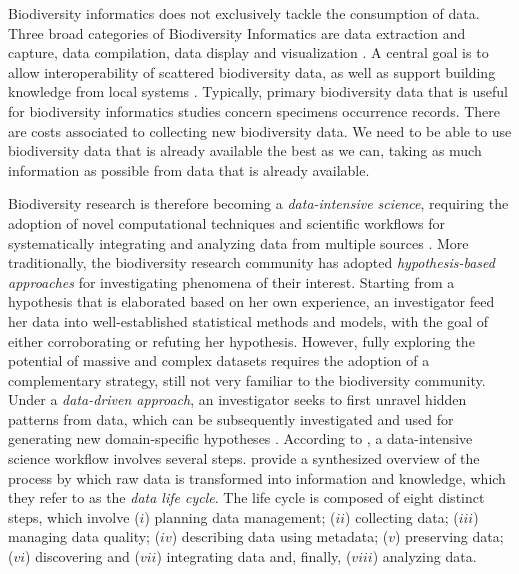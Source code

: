 Biodiversity informatics does not exclusively tackle the consumption of data.
Three broad categories of Biodiversity Informatics are data extraction and capture, data compilation, data display and visualization \cite{Peterson2010}.
A central goal is to allow interoperability of scattered biodiversity data, as well as support building knowledge from local systems \cite{Bisby2000}.
Typically, primary biodiversity data that is useful for biodiversity informatics studies concern specimens occurrence records.
There are costs associated to collecting new biodiversity data.
We need to be able to use biodiversity data that is already available the best as we can, taking as much information as possible from data that is already available.


Biodiversity research is therefore becoming a \textit{data-intensive science}, requiring the adoption of novel computational techniques and scientific workflows for systematically integrating and analyzing data from multiple sources \cite{Kelling2009}.
%
More traditionally, the biodiversity research community has adopted \textit{hypothesis-based approaches} for investigating phenomena of their interest.
Starting from a hypothesis that is elaborated based on her own experience, an investigator feed her data into well-established statistical methods and models, with the goal of either corroborating or refuting her hypothesis.
However, fully exploring the potential of massive and complex datasets requires the adoption of a complementary strategy, still not very familiar to the biodiversity community.
Under a \textit{data-driven approach}, an investigator seeks to first unravel hidden patterns from data, which can be subsequently investigated and used for generating new domain-specific hypotheses \cite{Kelling2009}.
%
According to , a data-intensive science workflow involves several steps.
%
 provide a synthesized overview of the process by which raw data is transformed into information and knowledge, which they refer to as the \textit{data life cycle}.
The life cycle is composed of eight distinct steps, which involve 
($i$) planning data management; 
($ii$) collecting data;
($iii$) managing data quality;
($iv$) describing data using metadata;
($v$) preserving data;
($vi$) discovering and 
($vii$) integrating data and, finally,
($viii$) analyzing data.




